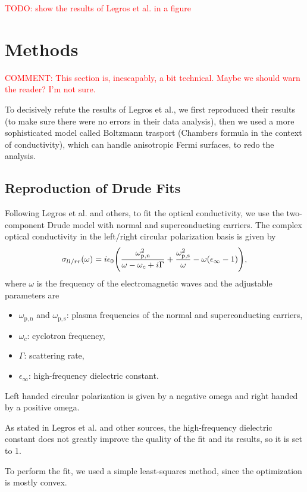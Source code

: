 \documentclass[12pt]{article}
\begin{document}
\textcolor{red}{TODO: show the results of Legros et al. in a figure}

\section{Methods}
\textcolor{red}{COMMENT: This section is, inescapably, a bit technical. Maybe we should warn the
reader? I'm not sure.}

To decisively refute the results of Legros et al., we first reproduced their results (to make sure
there were no errors in their data analysis), then we used a more sophisticated model called
Boltzmann trasport (Chambers formula in the context of conductivity), which can handle anisotropic
Fermi surfaces, to redo the analysis.

\subsection{Reproduction of Drude Fits}
Following Legros et al.\cite{legros2022} and others\cite{post2021}, to fit the optical conductivity,
we use the two-component Drude model with normal and superconducting carriers. The complex optical
conductivity in the left/right circular polarization basis is given by
\begin{equation}
    \sigma_{ll/rr}(\omega) = i\epsilon_0\qty(
        \frac{\omega^2_{\mathrm{p,n}}}{\omega-\omega_c+i\Gamma}
        + \frac{\omega^2_{\mathrm{p,s}}}{\omega} - \omega(\epsilon_{\infty} - 1)),
\end{equation}
where $\omega$ is the frequency of the electromagnetic waves and the adjustable parameters are
\begin{itemize}
    \item $\omega_{\mathrm{p,n}}$ and $\omega_{\mathrm{p,s}}$: plasma frequencies of the normal and
        superconducting carriers,
    \item $\omega_c$: cyclotron frequency,
    \item $\Gamma$: scattering rate,
    \item $\epsilon_{\infty}$: high-frequency dielectric constant.
\end{itemize}
Left handed circular polarization is given by a negative omega and right handed by a positive omega.

As stated in Legros et al. and other sources, the high-frequency dielectric constant does not
greatly improve the quality of the fit and its results, so it is set to 1.

To perform the fit, we used a simple least-squares method, since the optimization is
mostly convex.
\end{document}
